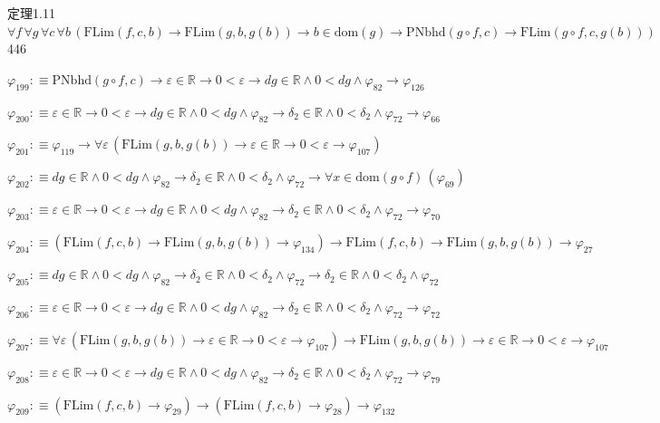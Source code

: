\begin{fullproof}{定理1.11}{$\forall f\,\forall g\,\forall c\,\forall b\,(\mathrm{FLim}(f,c,b) \to \mathrm{FLim}(g,b,g(b)) \to b \in \mathrm{dom}(g) \to \mathrm{PNbhd}(g \circ f,c) \to \mathrm{FLim}(g \circ f,c,g(b)))$}{446}
\begin{abbrevlist}
\item $\varphi_{199} :\equiv \mathrm{PNbhd}(g \circ f,c) \to \varepsilon \in \mathbb{R} \to 0 < \varepsilon \to \mathit{dg} \in \mathbb{R} \land 0 < \mathit{dg} \land \varphi_{82} \to \varphi_{126}$
\item $\varphi_{200} :\equiv \varepsilon \in \mathbb{R} \to 0 < \varepsilon \to \mathit{dg} \in \mathbb{R} \land 0 < \mathit{dg} \land \varphi_{82} \to \delta_{2} \in \mathbb{R} \land 0 < \delta_{2} \land \varphi_{72} \to \varphi_{66}$
\item $\varphi_{201} :\equiv \varphi_{119} \to \forall \varepsilon\,(\mathrm{FLim}(g,b,g(b)) \to \varepsilon \in \mathbb{R} \to 0 < \varepsilon \to \varphi_{107})$
\item $\varphi_{202} :\equiv \mathit{dg} \in \mathbb{R} \land 0 < \mathit{dg} \land \varphi_{82} \to \delta_{2} \in \mathbb{R} \land 0 < \delta_{2} \land \varphi_{72} \to \forall x \in \mathrm{dom}(g \circ f)\,(\varphi_{69})$
\item $\varphi_{203} :\equiv \varepsilon \in \mathbb{R} \to 0 < \varepsilon \to \mathit{dg} \in \mathbb{R} \land 0 < \mathit{dg} \land \varphi_{82} \to \delta_{2} \in \mathbb{R} \land 0 < \delta_{2} \land \varphi_{72} \to \varphi_{70}$
\item $\varphi_{204} :\equiv (\mathrm{FLim}(f,c,b) \to \mathrm{FLim}(g,b,g(b)) \to \varphi_{134}) \to \mathrm{FLim}(f,c,b) \to \mathrm{FLim}(g,b,g(b)) \to \varphi_{27}$
\item $\varphi_{205} :\equiv \mathit{dg} \in \mathbb{R} \land 0 < \mathit{dg} \land \varphi_{82} \to \delta_{2} \in \mathbb{R} \land 0 < \delta_{2} \land \varphi_{72} \to \delta_{2} \in \mathbb{R} \land 0 < \delta_{2} \land \varphi_{72}$
\item $\varphi_{206} :\equiv \varepsilon \in \mathbb{R} \to 0 < \varepsilon \to \mathit{dg} \in \mathbb{R} \land 0 < \mathit{dg} \land \varphi_{82} \to \delta_{2} \in \mathbb{R} \land 0 < \delta_{2} \land \varphi_{72} \to \varphi_{72}$
\item $\varphi_{207} :\equiv \forall \varepsilon\,(\mathrm{FLim}(g,b,g(b)) \to \varepsilon \in \mathbb{R} \to 0 < \varepsilon \to \varphi_{107}) \to \mathrm{FLim}(g,b,g(b)) \to \varepsilon \in \mathbb{R} \to 0 < \varepsilon \to \varphi_{107}$
\item $\varphi_{208} :\equiv \varepsilon \in \mathbb{R} \to 0 < \varepsilon \to \mathit{dg} \in \mathbb{R} \land 0 < \mathit{dg} \land \varphi_{82} \to \delta_{2} \in \mathbb{R} \land 0 < \delta_{2} \land \varphi_{72} \to \varphi_{79}$
\item $\varphi_{209} :\equiv (\mathrm{FLim}(f,c,b) \to \varphi_{29}) \to (\mathrm{FLim}(f,c,b) \to \varphi_{28}) \to \varphi_{132}$

\end{abbrevlist}
\end{fullproof}

